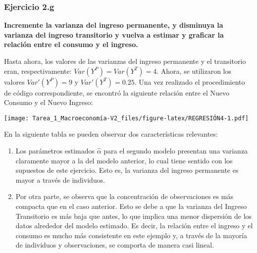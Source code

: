 \documentclass[
]{article}
\begin{document}
\newpage

\hypertarget{ejercicio-2.g}{%
\subsubsection{Ejercicio 2.g}\label{ejercicio-2.g}}

\textbf{Incremente la varianza del ingreso permanente, y disminuya la
varianza del ingreso transitorio y vuelva a estimar y graficar la
relación entre el consumo y el ingreso.}

Hasta ahora, los valores de las varianzas del ingreso permanente y el
transitorio eran, respectivamente: \(Var(Y^P) = Var(Y^T) = 4\). Ahora,
se utilizaron los valores \(Var'(Y^P) = 9\) y \(Var'(Y^T) = 0.25\). Una
vez realizado el procedimiento de código correspondiente, se encontró la
siguiente relación entre el Nuevo Consumo y el Nuevo Ingreso:

\texttt{[image: Tarea\_1\_Macroeconomía-V2\_files/figure-latex/REGRESIÓN4-1.pdf]}

En la siguiente tabla se pueden observar dos características relevantes:

\begin{enumerate}
\def\labelenumi{\arabic{enumi}.}
\item
  Los parámetros estimados \(\hat{\alpha}\) para el segundo modelo
  presentan una varianza claramente mayor a la del modelo anterior, lo
  cual tiene sentido con los supuestos de este ejercicio. Esto es, la
  varianza del ingreso permanente es mayor a través de individuos.
\item
  Por otra parte, se observa que la concentración de observaciones es
  más compacta que en el caso anterior. Esto se debe a que la varianza
  del Ingreso Transitorio es más baja que antes, lo que implica una
  menor dispersión de los datos alrededor del modelo estimado. Es decir,
  la relación entre el ingreso y el consumo es mucho más consistente en
  este ejemplo y, a través de la mayoría de individuos y observaciones,
  se comporta de manera casi lineal.
\end{enumerate}
\end{document}
